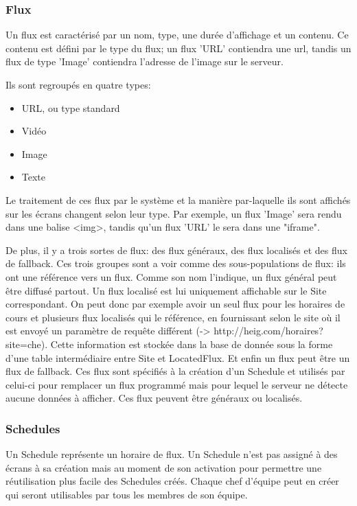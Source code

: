 \documentclass[french]{article}
\begin{document}
\subsubsection{Flux}

Un flux est caractérisé par un nom, type, une durée d'affichage et un contenu. Ce contenu est défini par le type du flux; un flux 'URL' contiendra une url, tandis un flux de type 'Image' contiendra l'adresse de l'image sur le serveur.

Ils sont regroupés en quatre types:
\begin{itemize}
	\item URL, ou type standard
	\item Vidéo
	\item Image
	\item Texte
\end{itemize}
Le traitement de ces flux par le système et la manière par-laquelle ils sont affichés sur les écrans changent selon leur type. Par exemple, un flux 'Image' sera rendu dans une balise <img>, tandis qu'un flux 'URL' le sera dans une "iframe".

De plus, il y a trois sortes de flux: des flux généraux, des flux localisés et des flux de fallback. Ces trois groupes sont a voir comme des sous-populations de flux: ils ont une référence vers un flux. \newline
Comme son nom l'indique, un flux général peut être diffusé partout. Un flux localisé est lui uniquement affichable sur le Site correspondant. On peut donc par exemple avoir un seul flux pour les horaires de cours et plusieurs flux localisés qui le référence, en fournissant selon le site où il est envoyé un paramètre de requête différent (-> http://heig.com/horaires?site=che). Cette information est stockée dans la base de donnée sous la forme d'une table intermédiaire entre Site et LocatedFlux. \newline
Et enfin un flux peut être un flux de fallback. Ces flux sont spécifiés à la création d'un Schedule et utilisés par celui-ci pour remplacer un flux programmé mais pour lequel le serveur ne détecte aucune données à afficher. Ces flux peuvent être généraux ou localisés. \newline \par

\subsubsection{Schedules}
Un Schedule représente un horaire de flux. Un Schedule n'est pas assigné à des écrans à sa création mais au moment de son activation pour permettre  une réutilisation plus facile des Schedules créés. Chaque chef d'équipe peut en créer qui seront utilisables par tous les membres de son équipe. \newline
\end{document}

